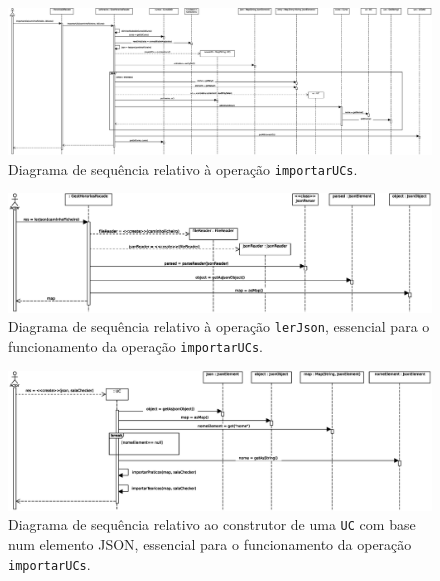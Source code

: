 \documentclass[12pt, a4paper]{article}
\begin{document}
\begin{landscape}
        \vspace*{\fill}
        \pagebreak
        \vspace*{\fill}

        \begin{figure}[H]
            \centering
            \includegraphics[scale=0.40]{Imagens/Modelos/importarUCsDAO.svg.eps}
            \caption{
                Diagrama de sequência relativo à operação \texttt{importarUCs}.
            }
        \end{figure}

        \vspace*{\fill}
        \pagebreak
        \vspace*{\fill}

        \begin{figure}[H]
            \centering
            \includegraphics[scale=0.80]{Imagens/Modelos/lerJSONDAO.svg.eps}
            \caption{
                Diagrama de sequência relativo à operação \texttt{lerJson}, essencial para o
                funcionamento da operação \texttt{importarUCs}.
            }
        \end{figure}

        \vspace*{\fill}
        \pagebreak
        \vspace*{\fill}

        \begin{figure}[H]
            \centering
            \includegraphics[scale=0.8]{Imagens/Modelos/importarUCsConstrutorUCDAO.svg.eps}
            \caption{
                Diagrama de sequência relativo ao construtor de uma \texttt{UC} com base num
                elemento JSON, essencial para o funcionamento da operação \texttt{importarUCs}.
            }
        \end{figure}


\end{landscape}
\end{document}
